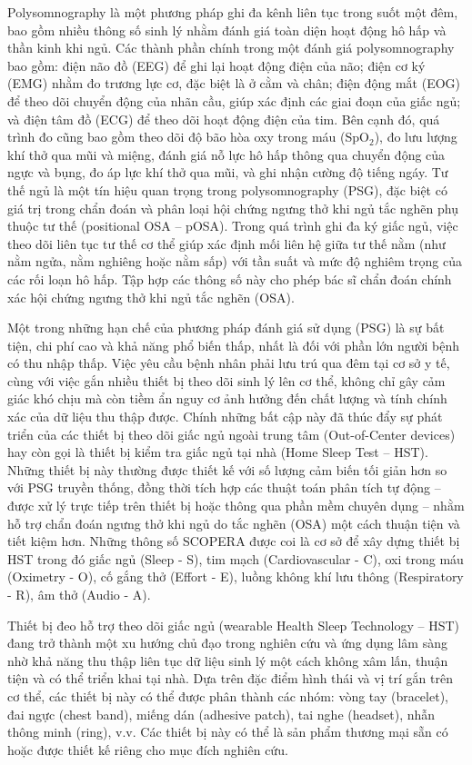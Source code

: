 Polysomnography là một phương pháp ghi đa kênh liên tục trong suốt một đêm, bao
gồm nhiều thông số sinh lý nhằm đánh giá toàn diện hoạt động hô hấp và thần
kinh khi ngủ. Các thành phần chính trong một đánh giá polysomnography bao gồm:
điện não đồ (EEG) để ghi lại hoạt động điện của não; điện cơ ký (EMG) nhằm đo
trương lực cơ, đặc biệt là ở cằm và chân; điện động mắt (EOG) để theo dõi
chuyển động của nhãn cầu, giúp xác định các giai đoạn của giấc ngủ; và điện tâm
đồ (ECG) để theo dõi hoạt động điện của tim. Bên cạnh đó, quá trình đo cũng bao
gồm theo dõi độ bão hòa oxy trong máu (SpO$_2$), đo lưu lượng khí thở qua mũi
và miệng, đánh giá nỗ lực hô hấp thông qua chuyển động của ngực và bụng, đo áp
lực khí thở qua mũi, và ghi nhận cường độ tiếng ngáy. Tư thế ngủ là một tín
hiệu quan trọng trong polysomnography (PSG), đặc biệt có giá trị trong chẩn
đoán và phân loại hội chứng ngưng thở khi ngủ tắc nghẽn phụ thuộc tư thế
(positional OSA – pOSA). Trong quá trình ghi đa ký giấc ngủ, việc theo dõi liên
tục tư thế cơ thể giúp xác định mối liên hệ giữa tư thế nằm (như nằm ngửa, nằm
nghiêng hoặc nằm sấp) với tần suất và mức độ nghiêm trọng của các rối loạn hô
hấp. Tập hợp các thông số này cho phép bác sĩ chẩn đoán chính xác hội chứng
ngưng thở khi ngủ tắc nghẽn (OSA).

Một trong những hạn chế của phương pháp đánh giá sử dụng (\gls{PSG}) là sự bất
tiện, chi phí cao và khả năng phổ biến thấp, nhất là đối với phần lớn người
bệnh có thu nhập thấp. Việc yêu cầu bệnh nhân phải lưu trú qua đêm tại cơ sở y
tế, cùng với việc gắn nhiều thiết bị theo dõi sinh lý lên cơ thể, không chỉ gây
cảm giác khó chịu mà còn tiềm ẩn nguy cơ ảnh hưởng đến chất lượng và tính chính
xác của dữ liệu thu thập được. Chính những bất cập này đã thúc đẩy sự phát
triển của các thiết bị theo dõi giấc ngủ ngoài trung tâm (Out-of-Center
devices) hay còn gọi là thiết bị kiểm tra giấc ngủ tại nhà (Home Sleep Test –
HST). Những thiết bị này thường được thiết kế với số lượng cảm biến tối giản
hơn so với PSG truyền thống, đồng thời tích hợp các thuật toán phân tích tự
động – được xử lý trực tiếp trên thiết bị hoặc thông qua phần mềm chuyên dụng –
nhằm hỗ trợ chẩn đoán ngưng thở khi ngủ do tắc nghẽn (OSA) một cách thuận tiện
và tiết kiệm hơn. Những thông số SCOPERA được coi là cơ sở để xây dựng thiết bị
HST trong đó giấc ngủ (Sleep - S), tim mạch (Cardiovascular - C), oxi trong máu
(Oximetry - O), cố gắng thở (Effort - E), luồng không khí lưu thông
(Respiratory - R), âm thở (Audio - A).

Thiết bị đeo hỗ trợ theo dõi giấc ngủ (wearable Health Sleep Technology – HST)
đang trở thành một xu hướng chủ đạo trong nghiên cứu và ứng dụng lâm sàng nhờ
khả năng thu thập liên tục dữ liệu sinh lý một cách không xâm lấn, thuận tiện
và có thể triển khai tại nhà. Dựa trên đặc điểm hình thái và vị trí gắn trên cơ
thể, các thiết bị này có thể được phân thành các nhóm: vòng tay (bracelet), đai
ngực (chest band), miếng dán (adhesive patch), tai nghe (headset), nhẫn thông
minh (ring), v.v. Các thiết bị này có thể là sản phẩm thương mại sẵn có hoặc
được thiết kế riêng cho mục đích nghiên cứu.

